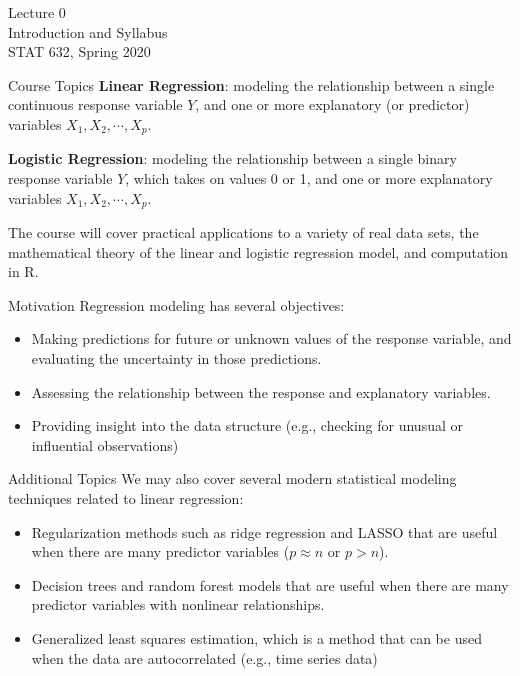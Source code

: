 \documentclass[10pt]{beamer}
\begin{document}
\begin{frame}
\large
Lecture 0\\
Introduction and Syllabus\\
STAT 632, Spring 2020
\end{frame}

\begin{frame}{Course Topics}
\textbf{Linear Regression}: modeling the relationship between a single continuous response variable $Y$, and one or more explanatory (or predictor) variables $X_1, X_2, \cdots, X_p$.
\vspace{10pt}

\textbf{Logistic Regression}: modeling the relationship between a single binary response variable $Y$, which takes on values 0 or 1, and one or more explanatory variables $X_1, X_2, \cdots, X_p$.\\
\vspace{10pt}

The course will cover practical applications to a variety of real data sets, the mathematical theory of the linear and logistic regression model, and computation in R.
\end{frame}

\begin{frame}{Motivation}
Regression modeling has several objectives:
\vspace{5pt}
\begin{itemize}
\item Making predictions for future or unknown values of the response variable, and evaluating the uncertainty in those predictions.
\vspace{5pt}
\item Assessing the relationship between the response and explanatory variables.
\vspace{5pt}
\item Providing insight into the data structure (e.g., checking for unusual or influential observations)
\end{itemize}
\end{frame}

\begin{frame}{Additional Topics}
We may also cover several modern statistical modeling techniques related to linear regression:
\vspace{5pt}
\begin{itemize}
\item Regularization methods such as ridge regression and LASSO that are useful when there are many predictor variables ($p \approx n$ or $p > n$).
\vspace{5pt}
\item Decision trees and random forest models that are useful when there are many predictor variables with nonlinear relationships.
\vspace{5pt}
\item Generalized least squares estimation, which is a method that can be used when the data are autocorrelated (e.g., time series data)
\end{itemize}
\end{frame}
\end{document}
